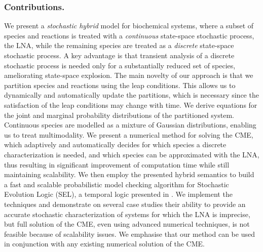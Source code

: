 \documentclass{llncs}
\begin{document}
\subsubsection{Contributions.}
We present a \emph{stochastic hybrid} model for biochemical systems, where a subset of species and reactions is treated with a \emph{continuous} state-space stochastic process, the LNA, while the remaining species are treated as a \emph{discrete} state-space stochastic process. A key advantage is that transient analysis of a discrete stochastic process is needed only for a substantially reduced set of species, ameliorating state-space explosion. %
{The main novelty of our approach is that we partition species and reactions using the leap conditions. This allows us to dynamically and automatically update the partitions, which is necessary since the satisfaction of the leap conditions may change with time.} %
We derive equations for the joint and marginal probability distributions of the partitioned system. Continuous species are modelled as a mixture of Gaussian distributions, enabling us to treat multimodality.
We present a numerical method for solving the CME, which adaptively and automatically decides for which species a discrete characterization is needed, and which species can be approximated with the LNA, thus resulting  in  significant
improvement of computation time while still maintaining scalability. We then employ the presented hybrid semantics to build a fast and scalable probabilistic model checking algorithm for Stochastic Evolution Logic (SEL), a temporal logic presented in \cite{cardelli2015stochastic}.
We implement the techniques and demonstrate on several case studies their ability to provide an accurate stochastic characterization of systems for which the LNA is imprecise, but full solution of the CME, even using advanced numerical techniques, is not feasible because of scalability issues.
We emphasise that our method can be used in conjunction with any existing numerical solution of the CME. %

\end{document}
